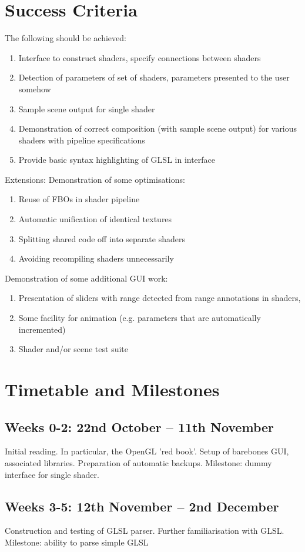 \section{Success Criteria}
The following should be achieved:
\begin{enumerate}
\item Interface to construct shaders, specify connections between shaders
\item Detection of parameters of set of shaders, parameters presented to the user somehow
\item Sample scene output for single shader
\item Demonstration of correct composition (with sample scene output) for various shaders with
pipeline specifications
\item Provide basic syntax highlighting of GLSL in interface
\end{enumerate}
Extensions:
Demonstration of some optimisations:
\begin{enumerate}
\item Reuse of FBOs in shader pipeline
\item Automatic unification of identical textures
\item Splitting shared code off into separate shaders
\item Avoiding recompiling shaders unnecessarily
\end{enumerate}
Demonstration of some additional GUI work:
\begin{enumerate}
\item Presentation of sliders with range detected from range annotations in shaders,
\item Some facility for animation (e.g. parameters that are automatically incremented)
\item Shader and/or scene test suite
\end{enumerate}

\section{Timetable and Milestones}
\subsection{Weeks 0-2: 22nd October – 11th November}
Initial reading. In particular, the OpenGL 'red book'. Setup of barebones GUI, associated libraries.
Preparation of automatic backups.
Milestone: dummy interface for single shader.
\subsection{Weeks 3-5: 12th November – 2nd December}
Construction and testing of GLSL parser. Further familiarisation with GLSL.
Milestone: ability to parse simple GLSL
